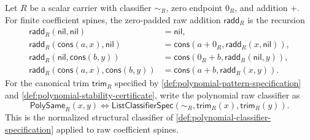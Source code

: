 \begin{definition}
\label{def:polynomial-raw-add-comparison-data}
Let $R$ be a scalar carrier with classifier $\sim_R$, zero endpoint $0_R$, and addition $+$. For finite coefficient spines, the zero-padded raw addition $\mathsf{radd}_R$ is the recursion
$$
\begin{aligned}
\mathsf{radd}_R(\mathsf{nil},\mathsf{nil})&=\mathsf{nil},\\
\mathsf{radd}_R(\mathsf{cons}(a,x),\mathsf{nil})&=\mathsf{cons}(a+0_R,\mathsf{radd}_R(x,\mathsf{nil})),\\
\mathsf{radd}_R(\mathsf{nil},\mathsf{cons}(b,y))&=\mathsf{cons}(0_R+b,\mathsf{radd}_R(\mathsf{nil},y)),\\
\mathsf{radd}_R(\mathsf{cons}(a,x),\mathsf{cons}(b,y))&=\mathsf{cons}(a+b,\mathsf{radd}_R(x,y)).
\end{aligned}
$$
For the canonical trim $\mathsf{trim}_R$ specified by \autoref{def:polynomial-pattern-specification} and \autoref{def:polynomial-stability-certificate}, write the polynomial raw classifier as
$$
\mathsf{PolySame}_R(x,y)\Longleftrightarrow
\mathsf{ListClassifierSpec}(\sim_R,\mathsf{trim}_R(x),\mathsf{trim}_R(y)).
$$
This is the normalized structural classifier of \autoref{def:polynomial-classifier-specification} applied to raw coefficient spines.
\end{definition}

